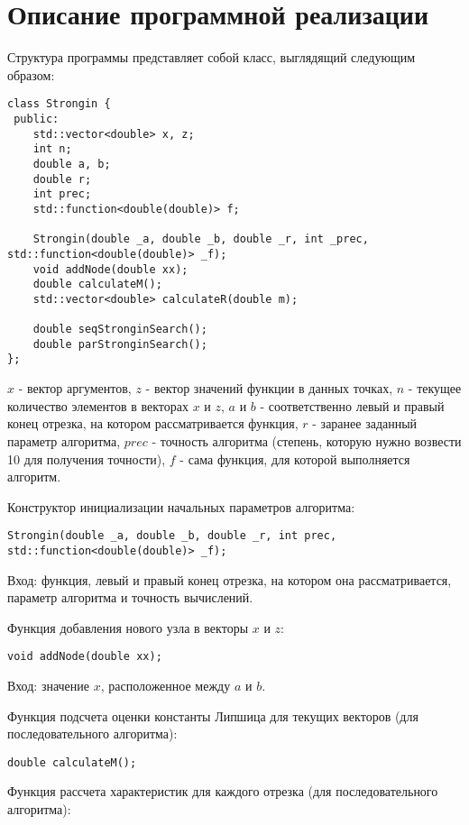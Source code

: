 \documentclass{report}
\begin{document}
\section*{Описание программной реализации}
Структура программы представляет собой класс, выглядящий следующим образом:
\begin{lstlisting}
class Strongin {
 public:
    std::vector<double> x, z;
    int n;
    double a, b;
    double r;
    int prec;
    std::function<double(double)> f;

    Strongin(double _a, double _b, double _r, int _prec, std::function<double(double)> _f);
    void addNode(double xx);
    double calculateM();
    std::vector<double> calculateR(double m);

    double seqStronginSearch();
    double parStronginSearch();
};
\end{lstlisting}
\par $x$ - вектор аргументов, $z$ - вектор значений функции в данных точках, $n$ - текущее количество элементов в векторах $x$ и $z$, $a$ и $b$ - соответственно левый и правый конец отрезка, на котором рассматривается функция, $r$ - заранее заданный параметр алгоритма, $prec$ - точность алгоритма (степень, которую нужно возвести 10 для получения точности), $f$ - сама функция, для которой выполняется алгоритм.
\par Конструктор инициализации начальных параметров алгоритма:
\begin{lstlisting}
Strongin(double _a, double _b, double _r, int prec, std::function<double(double)> _f);
\end{lstlisting}
\par Вход: функция, левый и правый конец отрезка, на котором она рассматривается, параметр алгоритма и точность вычислений.
\par Функция добавления нового узла в векторы $x$ и $z$:
\begin{lstlisting}
void addNode(double xx);
\end{lstlisting}
\par Вход: значение $x$, расположенное между $a$ и $b$.
\par Функция подсчета оценки константы Липшица для текущих векторов (для последовательного алгоритма):
\begin{lstlisting}
double calculateM();
\end{lstlisting}
\par Функция рассчета характеристик для каждого отрезка (для последовательного алгоритма):
\end{document}
